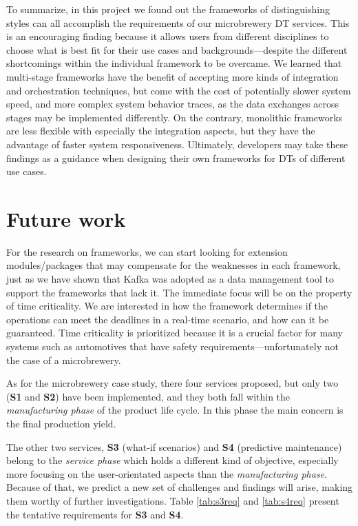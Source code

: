 To summarize, in this project we found out the frameworks of distinguishing styles can all accomplish the requirements of our microbrewery DT services. This is an encouraging finding because it allows users from different disciplines to choose what is best fit for their use cases and backgrounds---despite the different shortcomings within the individual framework to be overcame. We learned that multi-stage frameworks have the benefit of accepting more kinds of integration and orchestration techniques, but come with the cost of potentially slower system speed, and more complex system behavior traces, as the data exchanges across stages may be implemented differently. On the contrary, monolithic frameworks are less flexible with especially the integration aspects, but they have the advantage of faster system responsiveness. Ultimately, developers may take these findings as a guidance when designing their own frameworks for DTs of different use cases.


\clearpage
\section{Future work} \label{sec:futurework}
For the research on frameworks, we can start looking for extension modules/packages that may compensate for the weaknesses in each framework, just as we have shown that Kafka was adopted as a data management tool to support the frameworks that lack it. The immediate focus will be on the property of time criticality. We are interested in how the framework determines if the operations can meet the deadlines in a real-time scenario, and how can it be guaranteed. Time criticality is prioritized because it is a crucial factor for many systems such as automotives that have safety requirements---unfortunately not the case of a microbrewery.

As for the microbrewery case study, there four services proposed, but only two (\textbf{S1} and \textbf{S2}) have been implemented, and they both fall within the \textit{manufacturing phase} of the product life cycle. In this phase the main concern is the final production yield. 

The other two services, \textbf{S3} (what-if scenarios) and \textbf{S4} (predictive maintenance) belong to the \textit{service phase} which holds a different kind of objective, especially more focusing on the user-orientated aspects than the \textit{manufacturing phase}. Because of that, we predict a new set of challenges and findings will arise, making them worthy of further investigations. Table \ref{tab:s3req} and \ref{tab:s4req} present the tentative requirements for \textbf{S3} and \textbf{S4}.

